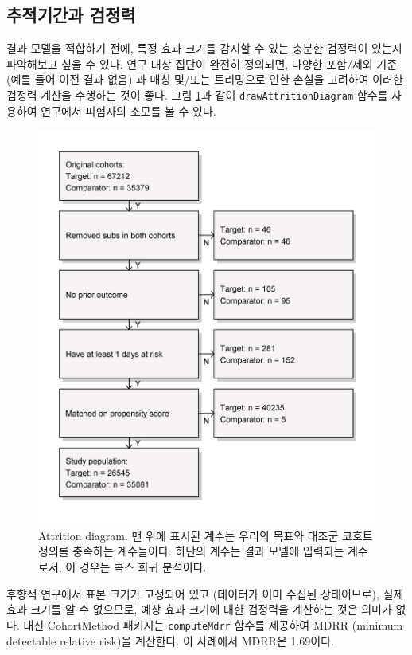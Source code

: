 \documentclass[11pt]{book}
\theoremstyle{definition}
\theoremstyle{definition}
\theoremstyle{definition}
\theoremstyle{remark}
\begin{document}
\subsection{추적기간과 검정력}\label{-}

결과 모델을 적합하기 전에, 특정 효과 크기를 감지할 수 있는 충분한
검정력이 있는지 파악해보고 싶을 수 있다. 연구 대상 집단이 완전히
정의되면, 다양한 포함/제외 기준 (예를 들어 이전 결과 없음) 과 매칭
및/또는 트리밍으로 인한 손실을 고려하여 이러한 검정력 계산을 수행하는
것이 좋다. 그림 \ref{fig:attrition}과 같이 \texttt{drawAttritionDiagram}
함수를 사용하여 연구에서 피험자의 소모를 볼 수 있다.

\begin{figure}

{\centering \includegraphics[width=0.7\linewidth]{images/PopulationLevelEstimation/attrition} 

}

\caption{Attrition diagram. 맨 위에 표시된 계수는 우리의 목표와 대조군 코호트 정의를 충족하는 계수들이다. 하단의 계수는 결과 모델에 입력되는 계수로서, 이 경우는 콕스 회귀 분석이다.}\label{fig:attrition}
\end{figure}

후향적 연구에서 표본 크기가 고정되어 있고 (데이터가 이미 수집된
상태이므로), 실제 효과 크기를 알 수 없으므로, 예상 효과 크기에 대한
검정력을 계산하는 것은 의미가 없다. 대신 CohortMethod 패키지는
\texttt{computeMdrr} 함수를 제공하여 MDRR (minimum detectable relative
risk)을 계산한다. 이 사례에서 MDRR은 1.69이다.
 
\end{document}
